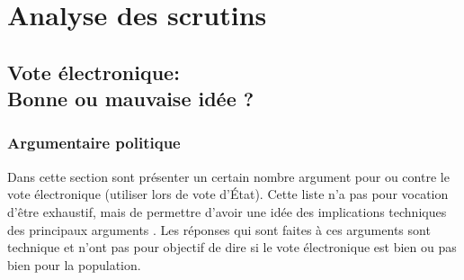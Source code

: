 \documentclass[../report]{subfiles}
\begin{document}
\newcommand\tabcritere[8]{
  \begin{center}
    \begin{tabular}{r|c|p{20em}}
      \hline
      Critère & Évaluation & Raison \\
      \hline
      \hline
      Avis des perdants & #1 & #2 \\
      \hline
      Indépendance aux petits candidats & #3 & #4 \\
      \hline
      Quasi unanimité du vote & #5 & #6 \\
      \hline
      Manipulabilité & #7 & #8 \\
      \hline
    \end{tabular}
  \end{center}
}



\part{Analyse des scrutins}

\chapter[Vote électronique: bonne ou mauvaise idée ?]{Vote électronique:\\Bonne ou mauvaise idée ?}

\section{Argumentaire politique}

Dans cette section sont présenter un certain nombre argument pour ou contre le vote 
électronique (utiliser lors de vote d'État). 
Cette liste n'a pas pour vocation d'être exhaustif, mais de permettre d'avoir une idée
des implications techniques des principaux arguments \cite{olivier_elections_2022,jaberg_10_nodate}.
Les réponses qui sont faites à ces arguments sont technique et n'ont pas pour objectif de dire si 
le vote électronique est bien ou pas bien pour la population.
\end{document}
